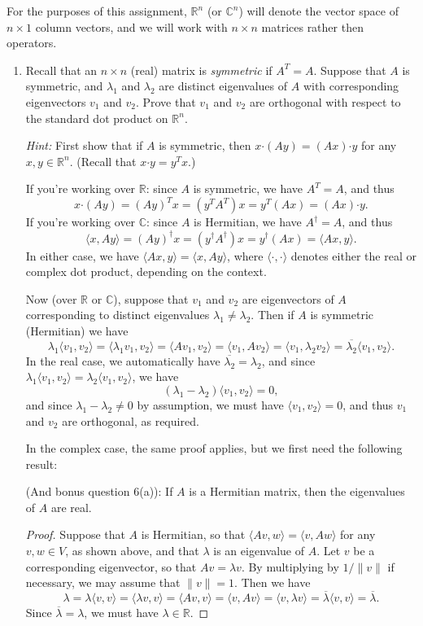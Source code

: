 \documentclass[letterpaper,12pt]{article}
\newcommand{\R}{\mathbb{R}}
\newcommand{\C}{\mathbb{C}}
\newcommand{\dotp}{\boldsymbol{\cdot}}
\newcommand{\len}[1]{\lVert #1\rVert}
\begin{document}
For the purposes of this assignment, $\R^n$ (or $\C^n$) will denote the vector space of $n\times 1$ column vectors, and we will work with $n\times n$ matrices rather then operators.
\begin{enumerate}
 \item Recall that an $n\times n$ (real) matrix is {\em symmetric} if $A^T=A$. Suppose that $A$ is symmetric, and $\lambda_1$ and $\lambda_2$ are distinct eigenvalues of $A$ with corresponding eigenvectors $v_1$ and $v_2$. Prove that $v_1$ and $v_2$ are orthogonal with respect to the standard dot product on $\R^n$.

{\em Hint:} First show that if $A$ is symmetric, then $x\boldsymbol{\cdot}(Ay) = (Ax)\boldsymbol{\cdot}y$ for any $x,y\in\R^n$. (Recall that $x\boldsymbol{\cdot}y = y^Tx$.)
 

If you're working over $\R$: since $A$ is symmetric, we have $A^T=A$, and thus
\[
 x\dotp (Ay) = (Ay)^Tx = (y^TA^T)x = y^T(Ax) = (Ax)\dotp y.
\]
If you're working over $\C$: since $A$ is Hermitian, we have $A^\dagger = A$, and thus
\[
 \langle x, Ay\rangle = (Ay)^\dagger x = (y^\dagger A^\dagger)x = y^\dagger (Ax) = \langle Ax,y\rangle.
\]
In either case, we have $\langle Ax ,y\rangle = \langle x,Ay\rangle$, where $\langle\dotp,\dotp\rangle$ denotes either the real or complex dot product, depending on the context.

Now (over $\R$ or $\C$), suppose that $v_1$ and $v_2$ are eigenvectors of $A$ corresponding to distinct eigenvalues $\lambda_1\neq \lambda_2$. Then if $A$ is symmetric (Hermitian) we have
\[
 \lambda_1\langle v_1,v_2\rangle = \langle \lambda_1v_1,v_2\rangle = \langle Av_1,v_2\rangle = \langle v_1, Av_2\rangle = \langle v_1,\lambda_2v_2\rangle = \overline{\lambda_2}\langle v_1,v_2\rangle.
\]
In the real case, we automatically have $\overline{\lambda_2}=\lambda_2$, and since $\lambda_1\langle v_1,v_2\rangle = \lambda_2\langle v_1,v_2\rangle$, we have
\[
 (\lambda_1-\lambda_2)\langle v_1,v_2\rangle =0,
\]
and since $\lambda_1-\lambda_2\neq 0$ by assumption, we must have $\langle v_1,v_2\rangle=0$, and thus $v_1$ and $v_2$ are orthogonal, as required.

In the complex case, the same proof applies, but we first need the following result:

 (And bonus question 6(a)): If $A$ is a Hermitian matrix, then the eigenvalues of $A$ are real.


\medskip

\begin{proof}
 Suppose that $A$ is Hermitian, so that $\langle Av,w\rangle = \langle v,Aw\rangle$ for any $v,w\in V$, as shown above, and that $\lambda$ is an eigenvalue of $A$. Let $v$ be a corresponding eigenvector, so that $Av = \lambda v$. By multiplying by $1/\len{v}$ if necessary, we may assume that $\len{v}=1$. Then we have
\[
 \lambda = \lambda\langle v,v\rangle = \langle \lambda v,v\rangle = \langle Av,v\rangle = \langle v,Av\rangle = \langle v,\lambda v\rangle = \overline{\lambda}\langle v,v\rangle = \overline{\lambda}.
\]
Since $\overline{\lambda}=\lambda$, we must have $\lambda\in\R$.
\end{proof}



\end{enumerate}
\end{document}
